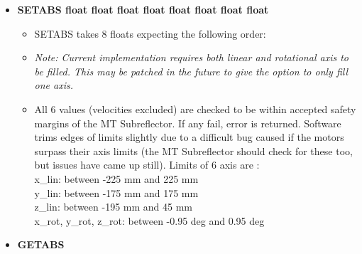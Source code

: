\documentclass[12pt]{report}
\begin{document}
	\begin{itemize}
	
		\item[] {\bf{SETABS float float float float float float float float}}
			\begin{itemize}
				\item[] {SETABS takes 8 floats expecting the following order:}
				
				\item[]  {\textit{Note: Current implementation requires both linear and rotational axis to be filled. This may be patched in the 
				future to give the option to only fill one axis.}}
				\item[] {All 6 values (velocities excluded) are checked to be within accepted safety margins of the MT Subreflector. If any fail, 
				error is returned. Software trims edges of limits slightly due to a difficult bug caused if the motors surpass their axis limits (the MT Subreflector should check for these too, but issues have came up still). Limits of 6 axis are : \\ 
				x\_lin: between -225 mm and 225 mm \\
				y\_lin: between -175 mm and 175 mm \\
				z\_lin: between -195 mm and 45 mm \\
				x\_rot, \hspace{2px} y\_rot, \hspace{2px} z\_rot: between -0.95 deg and 0.95 deg}
				
			\end{itemize}
			

		\item[] {\bf{GETABS}}
                        

\end{itemize}
\end{document}
